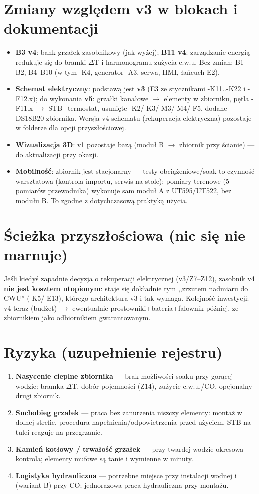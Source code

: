 \documentclass[11pt,a4paper]{article}
\begin{document}
\section{Zmiany względem v3 w blokach i dokumentacji}
\begin{itemize}
\item \textbf{B3 v4}: bank grzałek zasobnikowy (jak wyżej); \textbf{B11 v4}: zarządzanie energią
redukuje się do bramki $\Delta$T i harmonogramu zużycia c.w.u. Bez zmian: B1--B2, B4--B10
(w tym -K4, generator -A3, serwa, HMI, łańcuch E2).
\item \textbf{Schemat elektryczny}: podstawą jest \textbf{v3} (E3 ze stycznikami -K11..-K22 i
-F12.x); do wykonania \textbf{v5}: grzałki kanałowe $\to$ elementy w zbiorniku, pętla -F11.x $\to$
STB+termostat, usunięte -K2/-K3/-M3/-M4/-F5, dodane DS18B20 zbiornika. Wersja v4 schematu
(rekuperacja elektryczna) pozostaje w folderze dla opcji przyszłościowej.
\item \textbf{Wizualizacja 3D}: v1 pozostaje bazą (moduł B $\to$ zbiornik przy ścianie) --- do
aktualizacji przy okazji.
\item \textbf{Mobilność}: zbiornik jest stacjonarny --- testy obciążeniowe/soak to czynność
warsztatowa (kontrola importu, serwis na stole); pomiary terenowe (5 pomiarów przewodnika)
wykonuje sam moduł A z UT595/UT522, bez modułu B. To zgodne z dotychczasową praktyką użycia.
\end{itemize}

\section{Ścieżka przyszłościowa (nic się nie marnuje)}
\label{sec:sciezka}
Jeśli kiedyś zapadnie decyzja o rekuperacji elektrycznej (v3/Z7--Z12), zasobnik v4 \textbf{nie jest
kosztem utopionym}: staje się dokładnie tym ,,zrzutem nadmiaru do CWU'' (-K5/-E13), którego
architektura v3 i tak wymaga. Kolejność inwestycji: v4 teraz (budżet) $\to$ ewentualnie
prostowniki+bateria+falownik później, ze zbiornikiem jako odbiornikiem gwarantowanym.

\section{Ryzyka (uzupełnienie rejestru)}
\begin{enumerate}[label=\textbf{R\arabic*.},start=16]
\item \textbf{Nasycenie cieplne zbiornika} --- brak możliwości soaku przy gorącej wodzie:
bramka $\Delta$T, dobór pojemności (Z14), zużycie c.w.u./CO, opcjonalny drugi zbiornik.
\item \textbf{Suchobieg grzałek} --- praca bez zanurzenia niszczy elementy: montaż w dolnej
strefie, procedura napełnienia/odpowietrzenia przed użyciem, STB na tulei reaguje na przegrzanie.
\item \textbf{Kamień kotłowy / trwałość grzałek} --- przy twardej wodzie okresowa kontrola;
elementy mufowe są tanie i wymienne w minuty.
\item \textbf{Logistyka hydrauliczna} --- potrzebne miejsce przy instalacji wodnej i (wariant B)
przy CO; jednorazowa praca hydrauliczna przy montażu.
\end{enumerate}
\end{document}
